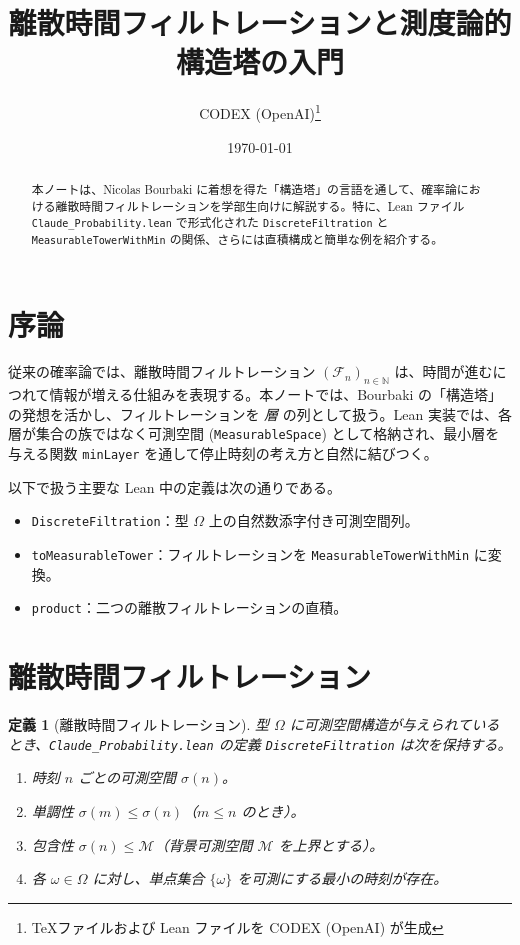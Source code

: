 \documentclass[a4paper]{ltjsarticle}
\title{離散時間フィルトレーションと測度論的構造塔の入門}
\author{CODEX (OpenAI)\thanks{TeXファイルおよび Lean ファイルを CODEX (OpenAI) が生成}}
\date{\today}
\newtheorem{definition}{定義}
\theoremstyle{remark}
\begin{document}
\maketitle

\begin{abstract}
本ノートは、Nicolas Bourbaki に着想を得た「構造塔」の言語を通して、確率論における離散時間フィルトレーションを学部生向けに解説する。特に、Lean ファイル \texttt{Claude\_Probability.lean} で形式化された \texttt{DiscreteFiltration} と \texttt{MeasurableTowerWithMin} の関係、さらには直積構成と簡単な例を紹介する。
\end{abstract}

\tableofcontents

\section{序論}

従来の確率論では、離散時間フィルトレーション $(\mathcal{F}_n)_{n\in \mathbb{N}}$ は、時間が進むにつれて情報が増える仕組みを表現する。本ノートでは、Bourbaki の「構造塔」の発想を活かし、フィルトレーションを \emph{層} の列として扱う。Lean 実装では、各層が集合の族ではなく可測空間 (\texttt{MeasurableSpace}) として格納され、最小層を与える関数 \texttt{minLayer} を通して停止時刻の考え方と自然に結びつく。

以下で扱う主要な Lean 中の定義は次の通りである。
\begin{itemize}[nosep]
  \item \texttt{DiscreteFiltration}：型 $\Omega$ 上の自然数添字付き可測空間列。
  \item \texttt{toMeasurableTower}：フィルトレーションを \texttt{MeasurableTowerWithMin} に変換。
  \item \texttt{product}：二つの離散フィルトレーションの直積。
\end{itemize}

\section{離散時間フィルトレーション}

\begin{definition}[離散時間フィルトレーション]
型 $\Omega$ に可測空間構造が与えられているとき、\texttt{Claude\_Probability.lean} の定義 \texttt{DiscreteFiltration} は次を保持する。
\begin{enumerate}[label=(\roman*),nosep]
  \item 時刻 $n$ ごとの可測空間 $\sigma(n)$。
  \item 単調性 $\sigma(m)\leq \sigma(n)$（$m\leq n$ のとき）。
  \item 包含性 $\sigma(n)\leq \mathcal{M}$（背景可測空間 $\mathcal{M}$ を上界とする）。
  \item 各 $\omega\in\Omega$ に対し、単点集合 $\{\omega\}$ を可測にする最小の時刻が存在。
\end{enumerate}
\end{definition}
\end{document}
